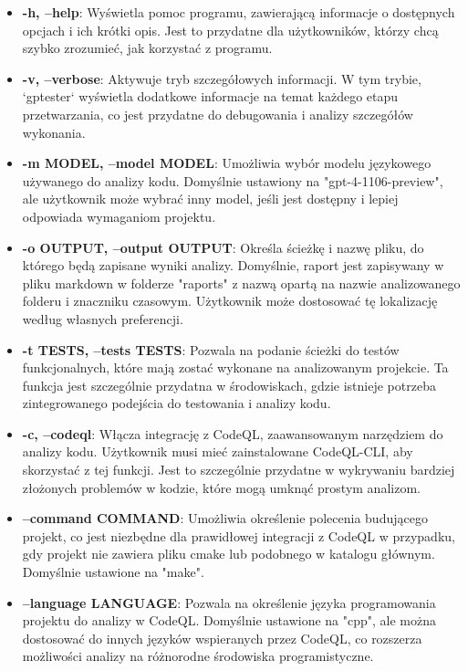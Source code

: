 \begin{itemize}
    \item \textbf{-h, --help}: Wyświetla pomoc programu, zawierającą informacje o dostępnych opcjach i ich krótki opis. Jest to przydatne dla użytkowników, którzy chcą szybko zrozumieć, jak korzystać z programu.
    
    \item \textbf{-v, --verbose}: Aktywuje tryb szczegółowych informacji. W tym trybie, `gptester` wyświetla dodatkowe informacje na temat każdego etapu przetwarzania, co jest przydatne do debugowania i analizy szczegółów wykonania.
    
    \item \textbf{-m MODEL, --model MODEL}: Umożliwia wybór modelu językowego używanego do analizy kodu. Domyślnie ustawiony na "gpt-4-1106-preview", ale użytkownik może wybrać inny model, jeśli jest dostępny i lepiej odpowiada wymaganiom projektu.
    
    \item \textbf{-o OUTPUT, --output OUTPUT}: Określa ścieżkę i nazwę pliku, do którego będą zapisane wyniki analizy. Domyślnie, raport jest zapisywany w pliku markdown w folderze "raports" z nazwą opartą na nazwie analizowanego folderu i znaczniku czasowym. Użytkownik może dostosować tę lokalizację według własnych preferencji.

    \item \textbf{-t TESTS, --tests TESTS}: Pozwala na podanie ścieżki do testów funkcjonalnych, które mają zostać wykonane na analizowanym projekcie. Ta funkcja jest szczególnie przydatna w środowiskach, gdzie istnieje potrzeba zintegrowanego podejścia do testowania i analizy kodu.

    \item \textbf{-c, --codeql}: Włącza integrację z CodeQL, zaawansowanym narzędziem do analizy kodu. Użytkownik musi mieć zainstalowane CodeQL-CLI, aby skorzystać z tej funkcji. Jest to szczególnie przydatne w wykrywaniu bardziej złożonych problemów w kodzie, które mogą umknąć prostym analizom.

    \item \textbf{--command COMMAND}: Umożliwia określenie polecenia budującego projekt, co jest niezbędne dla prawidłowej integracji z CodeQL w przypadku, gdy projekt nie zawiera pliku cmake lub podobnego w katalogu głównym. Domyślnie ustawione na "make".

    \item \textbf{--language LANGUAGE}: Pozwala na określenie języka programowania projektu do analizy w CodeQL. Domyślnie ustawione na "cpp", ale można dostosować do innych języków wspieranych przez CodeQL, co rozszerza możliwości analizy na różnorodne środowiska programistyczne.

\end{itemize}

